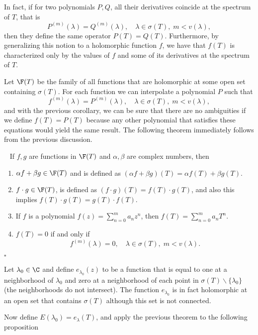In fact, if for two polynomials $P,Q$, all their derivatives coincide at the spectrum of $T$, that is
\[ P^{(m)} (\lambda) = Q^{(m)}(\lambda),\quad \lambda \in \sigma(T),\; m < v(\lambda), \]
then they define the same operator $P(T) = Q(T)$. Furthermore, by generalizing this notion to a holomorphic function $f$, we have that $f(T)$ is characterized only by the values of $f$ and some of its derivatives at the spectrum of $T$.

Let $\F(T)$ be the family of all functions that are holomorphic at some open set containing $\sigma(T)$. For each function we can interpolate a polynomial $P$ such that
\[ f^{(m)} (\lambda) = P^{(m)}(\lambda),\quad \lambda \in \sigma(T),\; m < v(\lambda), \]
and with the previous corollary, we can be sure that there are no ambiguities if we define $f(T) = P(T)$ because any other polynomial that satisfies these equations would yield the same result. The following theorem immediately follows from the previous discussion.

\begin{theorem}~\label{ch2t3} If $f,g$ are functions in $\F(T)$ and $\alpha,\beta$ are complex numbers, then
    \begin{enumerate}[label = (\alph*)]
        \item $\alpha f + \beta g \in \F(T)$ and is defined as $(\alpha f + \beta g) (T) = \alpha f(T) + \beta g(T)$.
        \item $f \cdot g \in \F(T)$, is defined as $(f \cdot g) (T) = f(T)\cdot g(T)$, and also this implies $f(T)\cdot g(T) = g(T)\cdot f(T)$.
        \item If $f$ is a polynomial $f(z) = \sum_{n = 0}^{m} a_n z^n$, then $f(T) = \sum_{n = 0}^{m} a_n T^n$.
        \item $f(T) = 0$ if and only if
        \[ f^{(m)} (\lambda) = 0,\quad \lambda \in \sigma(T),\; m < v(\lambda). \]
    \end{enumerate}
\end{theorem}
$ $\hfill $\square$

Let $\lambda_0 \in \C$ and define $e_{\lambda_0}(z)$ to be a function that is equal to one at a neighborhood of $\lambda_0$ and zero at a neighborhood of each point in $\sigma(T) \backslash \{\lambda_0\}$ (the neighborhoods do not intersect). The function $e_{\lambda_0}$ is in fact holomorphic at an open set that contains $\sigma(T)$ although this set is not connected. 

Now define $E(\lambda_0) = e_{\lambda}(T)$, and apply the previous theorem to the following proposition

